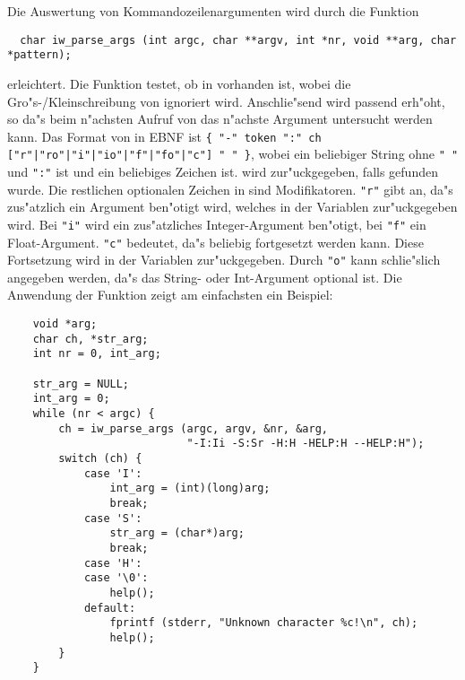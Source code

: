 Die Auswertung von Kommandozeilenargumenten wird durch die Funktion
\begin{small}
\linespread{0.9}
\begin{verbatim}
  char iw_parse_args (int argc, char **argv, int *nr, void **arg, char *pattern);
\end{verbatim}
\end{small}
erleichtert. Die Funktion testet, ob  in
 vorhanden ist, wobei die Gro"s-/Kleinschreibung von
 ignoriert wird. Anschlie"send wird  passend
erh"oht, so da"s beim n"achsten Aufruf von 
das n"achste Argument untersucht werden kann. Das Format von
 in EBNF ist
\verb#{ "-" token ":" ch ["r"|"ro"|"i"|"io"|"f"|"fo"|"c"] " " }#,
wobei  ein beliebiger String ohne \verb|" "| und
\verb|":"| ist und  ein beliebiges Zeichen ist. 
wird zur"uckgegeben, falls  gefunden wurde. Die
restlichen optionalen Zeichen in  sind
Modifikatoren. \verb|"r"| gibt an, da"s zus"atzlich ein Argument
ben"otigt wird, welches in der Variablen  zur"uckgegeben
wird. Bei \verb|"i"| wird ein zus"atzliches Integer-Argument
ben"otigt, bei \verb|"f"| ein Float-Argument. \verb|"c"| bedeutet,
da"s  beliebig fortgesetzt werden kann. Diese Fortsetzung
wird in der Variablen  zur"uckgegeben. Durch \verb|"o"|
kann schlie"slich angegeben werden, da"s das String- oder
Int-Argument optional ist. Die Anwendung der Funktion
 zeigt am einfachsten ein Beispiel:
\begin{small}
\linespread{0.9}
\begin{verbatim}
    void *arg;
    char ch, *str_arg;
    int nr = 0, int_arg;

    str_arg = NULL;
    int_arg = 0;
    while (nr < argc) {
        ch = iw_parse_args (argc, argv, &nr, &arg,
                            "-I:Ii -S:Sr -H:H -HELP:H --HELP:H");
        switch (ch) {
            case 'I':
                int_arg = (int)(long)arg;
                break;
            case 'S':
                str_arg = (char*)arg;
                break;
            case 'H':
            case '\0':
                help();
            default:
                fprintf (stderr, "Unknown character %c!\n", ch);
                help();
        }
    }
\end{verbatim}
\end{small}


